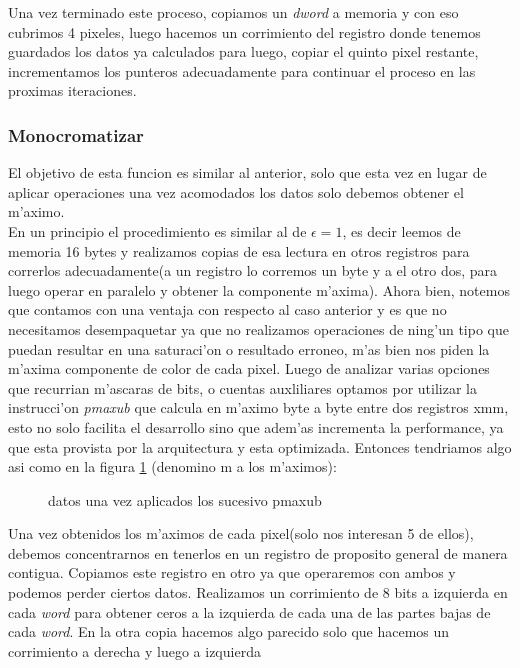 Una vez terminado este proceso, copiamos un \textit{dword} a memoria y con eso cubrimos 4 pixeles,
luego hacemos un corrimiento del registro donde tenemos guardados los datos ya calculados para luego,
copiar el quinto pixel restante, incrementamos los punteros adecuadamente para continuar el 
proceso en las proximas iteraciones.\\


\subsubsection{Monocromatizar \protect{$\epsilon = \infty $} }
El objetivo de esta funcion es similar al anterior, solo que esta vez en lugar de aplicar operaciones
una vez acomodados los datos solo debemos obtener el m'aximo.\\
En un principio el procedimiento es similar al de  $\epsilon= 1$, es decir leemos de memoria 16 bytes
y realizamos copias de esa lectura en otros registros para correrlos adecuadamente(a un registro lo corremos un byte 
 y a el otro dos, para luego operar en paralelo y obtener la componente m'axima). Ahora bien, 
notemos que contamos con una ventaja con respecto al caso anterior y es que no necesitamos desempaquetar
ya que no realizamos operaciones de ning'un tipo que puedan resultar en una saturaci'on o 
resultado erroneo, m'as bien nos piden la m'axima componente de color de cada pixel. Luego de analizar 
varias opciones que recurrian m'ascaras de bits, o cuentas auxliliares optamos por utilizar la instrucci'on
\textit{pmaxub} que calcula en m'aximo byte a byte entre dos registros xmm, esto no solo facilita 
el desarrollo sino que adem'as incrementa la performance, ya que esta provista por la arquitectura y 
esta optimizada. Entonces tendriamos algo asi como en la figura \ref{est:m-seis} (denomino m a los m'aximos):\\
\begin{figure}[hb]
\caption{datos una vez aplicados los sucesivo pmaxub}
\label{est:m-seis}
\end{figure}
Una vez obtenidos los m'aximos de cada pixel(solo nos interesan 5 de ellos), debemos concentrarnos en
tenerlos en un registro de proposito general de manera contigua. 
Copiamos este registro en otro ya que operaremos con ambos y podemos perder ciertos datos. Realizamos un 
corrimiento de 8 bits a izquierda en cada \textit{word} para obtener ceros a la izquierda de cada una de las partes bajas de
cada \textit{word}. En la otra copia hacemos algo parecido solo que hacemos un corrimiento a derecha y luego a izquierda
